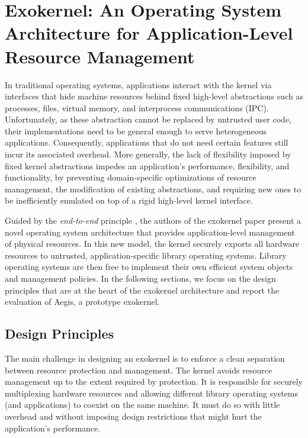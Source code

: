 \section{Exokernel: An Operating System Architecture for Application-Level Resource Management}

In traditional operating systems, applications interact with the kernel via interfaces that hide machine resources behind fixed high-level abstractions such as processes, files, virtual memory, and interprocess communications (IPC).
Unfortunately, as these abstraction cannot be replaced by untrusted user code, their implementations need to be general enough to serve heterogeneous applications.
Consequently, applications that do not need certain features still incur its associated overhead.
More generally, the lack of flexibility imposed by fixed kernel abstractions impedes an application's performance, flexibility, and functionality, by preventing domain-specific optimizations of resource management, the modification of existing abstractions, and requiring new ones to be inefficiently emulated on top of a rigid high-level kernel interface.

Guided by the \emph{end-to-end} principle \cite{DBLP:journals/tocs/SaltzerRC84}, the authors of the exokernel paper \cite{DBLP:conf/sosp/EnglerKO95} present a novel operating system architecture that provides application-level management of physical resources.
In this new model, the kernel securely exports all hardware resources to untrusted, application-specific library operating systems.
Library operating systems are then free to implement their own efficient system objects and management policies.
In the following sections, we focus on the design principles that are at the heart of the exokernel architecture and report the evaluation of Aegis, a prototype exokernel.

\subsection{Design Principles}
The main challenge in designing an exokernel is to enforce a clean separation between resource protection and management.
The kernel avoids resource management up to the extent required by protection.
It is responsible for securely multiplexing hardware resources and allowing different library operating systems (and applications) to coexist on the same machine.
It must do so with little overhead and without imposing design restrictions that might hurt the application's performance.

